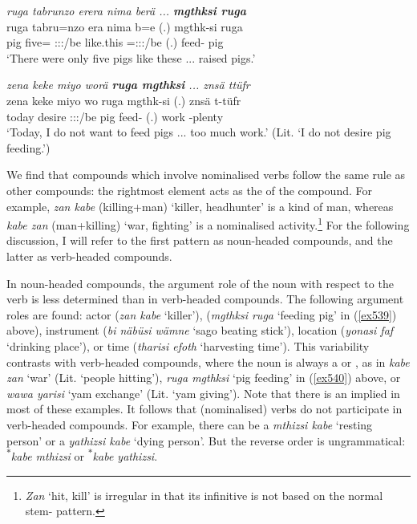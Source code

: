 \begin{exe}
	\ex \emph{ruga tabrunzo erera nima berä ... \textbf{mgthksi ruga}}\\
	\gll ruga tabru=nzo era nima b=e (.) mgthk-si ruga\\
	pig five=\Only{} \Stpl:\Sbj:\Pst:\Ipfv/be {like.this} \Med=\Stpl:\Sbj:\Nonpast:\Ipfv/be (.) feed-\Nmlz{} pig\\
	\trans `There were only five pigs like these ... raised pigs.'
	\label{ex539}
\end{exe}
\begin{exe}
	\ex \emph{zena keke miyo worä \textbf{ruga mgthksi} ... znsä ttüfr}\\
	\gll zena keke miyo wo ruga mgthk-si (.) znsä t-tüfr\\
	today \Neg{} desire \Fsg:\Sbj:\Nonpast:\Ipfv/be pig feed-\Nmlz{} (.) work \Redup-plenty\\
	\trans `Today, I do not want to feed pigs ... too much work.' (Lit. `I do not desire pig feeding.')
	\label{ex540}
\end{exe}

We find that compounds which involve nominalised verbs follow the same rule as other compounds: the rightmost element acts as the  of the compound. For example, \emph{zan kabe} (killing+man) `killer, headhunter' is a kind of man, whereas \emph{kabe zan} (man+killing) `war, fighting' is a nominalised activity.\footnote{\emph{Zan} `hit, kill' is irregular in that its infinitive is not based on the normal stem-\Nmlz{} pattern.} For the following discussion, I will refer to the first pattern as noun-headed compounds, and the latter as verb-headed compounds.%

In noun-headed compounds, the argument role of the noun with respect to the verb is less determined than in verb-headed compounds. The following argument roles are found: actor (\emph{zan kabe} `killer'),  (\emph{mgthksi ruga} `feeding pig' in (\ref{ex539}) above), instrument (\emph{bi näbüsi wämne} `sago beating stick'), location (\emph{yonasi faf} `drinking place'), or time (\emph{tharisi efoth} `harvesting time'). This variability contrasts with verb-headed compounds, where the noun is always a  or , as in \emph{kabe zan} `war' (Lit. `people hitting'), \emph{ruga mgthksi} `pig feeding' in (\ref{ex540}) above, or \emph{wawa yarisi} `yam exchange' (Lit. `yam giving'). Note that there is an implied  in most of these examples. It follows that (nominalised)  verbs do not participate in verb-headed compounds. For example, there can be a \emph{mthizsi kabe} `resting person' or a \emph{yathizsi kabe} `dying person'. But the reverse order is ungrammatical: \textsuperscript{$\ast$}\emph{kabe mthizsi} or \textsuperscript{$\ast$}\emph{kabe yathizsi}.%

